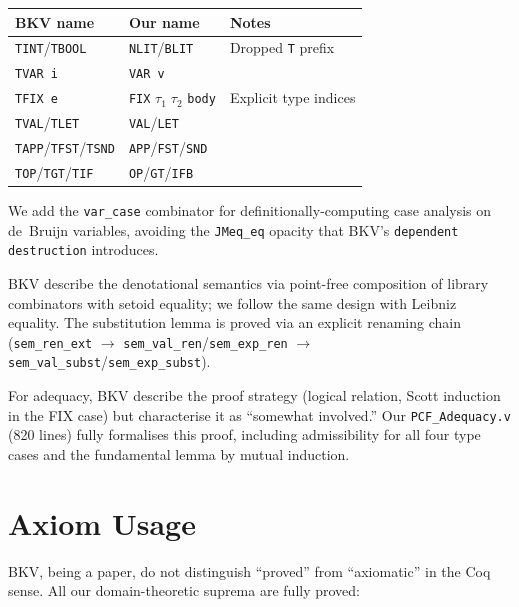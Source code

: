 \begin{table}[h]
\centering
\small
\begin{tabular}{@{}l l l@{}}
\toprule
\textbf{BKV name} & \textbf{Our name} & \textbf{Notes} \\
\midrule
\texttt{TINT}/\texttt{TBOOL}   & \texttt{NLIT}/\texttt{BLIT}
  & Dropped \texttt{T} prefix \\
\texttt{TVAR i}                & \texttt{VAR v}
  & \\
\texttt{TFIX e}                & \texttt{FIX} $\tau_1\;\tau_2$ \texttt{body}
  & Explicit type indices \\
\texttt{TVAL}/\texttt{TLET}    & \texttt{VAL}/\texttt{LET}
  & \\
\texttt{TAPP}/\texttt{TFST}/\texttt{TSND}
  & \texttt{APP}/\texttt{FST}/\texttt{SND}
  & \\
\texttt{TOP}/\texttt{TGT}/\texttt{TIF}
  & \texttt{OP}/\texttt{GT}/\texttt{IFB}
  & \\
\bottomrule
\end{tabular}
\end{table}

We add the \texttt{var\_case} combinator for definitionally-computing
case analysis on de~Bruijn variables, avoiding the \texttt{JMeq\_eq}
opacity that BKV's \texttt{dependent destruction} introduces.

BKV describe the denotational semantics via point-free composition of
library combinators with setoid equality; we follow the same design
with Leibniz equality.  The substitution lemma is proved via an
explicit renaming chain (\texttt{sem\_ren\_ext} $\to$
\texttt{sem\_val\_ren}/\texttt{sem\_exp\_ren} $\to$
\texttt{sem\_val\_subst}/\texttt{sem\_exp\_subst}).

For adequacy, BKV describe the proof strategy (logical relation, Scott
induction in the FIX case) but characterise it as ``somewhat
involved.''
Our \texttt{PCF\_Adequacy.v} (820 lines) fully formalises this proof,
including admissibility for all four type cases and the fundamental
lemma by mutual induction.

\section*{Axiom Usage}

BKV, being a paper, do not distinguish ``proved'' from ``axiomatic'' in
the Coq sense.  All our domain-theoretic suprema are fully proved:

